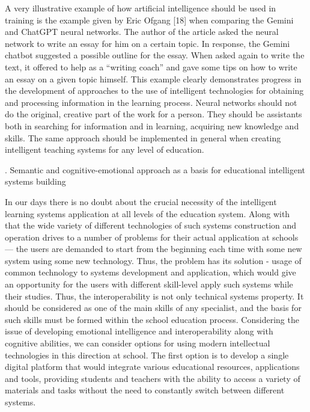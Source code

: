 \documentclass[10pt, a4paper]{article}
\begin{document}
\begin{multicols}{2}
        A very illustrative example of how artificial intelligence should be used in training is the example given by Eric Ofgang [18] when comparing the Gemini and
        ChatGPT neural networks. The author of the article asked the neural network to write an essay for him on a certain topic. In response, the Gemini chatbot suggested a possible outline for the essay. When asked again to write the text, it offered to help as a “writing coach” and gave some tips on how to write an essay on a given topic himself. This example clearly demonstrates progress in the development of approaches to the use of intelligent technologies for obtaining and processing information in the learning process. Neural networks should not do the original, creative part of the work for a person. They should be assistants both in searching for information and in learning, acquiring new knowledge and skills. The same approach should be implemented in general when creating intelligent teaching systems for any level of education.
        
        \begin{center}
             \MakeUppercase{}. Semantic and cognitive-emotional approach as a basis for educational intelligent systems building
        \end{center}
        
        In our days there is no doubt about the crucial necessity of the intelligent learning systems application at all levels of the education system. Along with that the wide variety of different technologies of such systems construction and operation drives to a number of problems for their actual application at schools — the users are demanded to start from the beginning each time with some new system using some new technology. Thus, the problem has its solution - usage of common technology to systems development and application, which would give an opportunity for the users with different skill-level apply such systems while their studies. Thus, the interoperability is not only technical systems property. It should be considered as one of the main skills of any specialist, and the basis for such skills must be formed within the school education process. Considering the issue of developing emotional intelligence and interoperability along with cognitive abilities, we can consider options for using modern intellectual technologies in this direction at school. The first option is to develop a single digital platform that would integrate various educational resources, applications and tools, providing students and teachers with the ability to access a variety of materials and tasks without the need to constantly switch between different systems.
        

\end{multicols}
\end{document}

